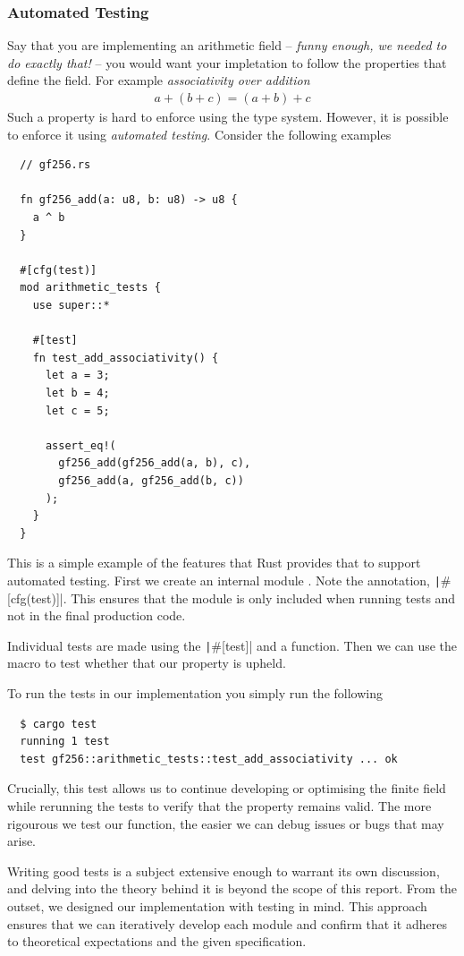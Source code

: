 \documentclass[twoside,11pt]{report}
\theoremstyle{definition}
\theoremstyle{plain}
\begin{document}
\subsubsection{Automated Testing}
Say that you are implementing an arithmetic field -- \textit{funny enough, we needed to do exactly that!} -- you would want your impletation to follow the properties that define the field. For example \textit{associativity over addition}
\begin{align}
  a + (b + c) = (a + b) + c
\end{align}
Such a property is hard to enforce using the type system. However, it is possible to enforce it using \textit{automated testing}. Consider the following examples
\begin{verbatim}
  // gf256.rs

  fn gf256_add(a: u8, b: u8) -> u8 {
    a ^ b
  }

  #[cfg(test)]
  mod arithmetic_tests {
    use super::*
    
    #[test]
    fn test_add_associativity() {
      let a = 3;
      let b = 4;
      let c = 5;

      assert_eq!(
        gf256_add(gf256_add(a, b), c), 
        gf256_add(a, gf256_add(b, c))
      );
    }
  }
\end{verbatim}
This is a simple example of the features that Rust provides that to support automated testing. First we create an internal module . Note the annotation, \texttt|#[cfg(test)]|. This ensures that the module is only included when running tests and not in the final production code.

Individual tests are made using the \texttt|#[test]| and a function. Then we can use the macro  to test whether that our property is upheld.

To run the tests in our implementation you simply run the following
\begin{verbatim}
  $ cargo test
  running 1 test
  test gf256::arithmetic_tests::test_add_associativity ... ok
\end{verbatim}
Crucially, this test allows us to continue developing or optimising the finite field while rerunning the tests to verify that the property remains valid. The more rigourous we test our function, the easier we can debug issues or bugs that may arise.

Writing good tests is a subject extensive enough to warrant its own discussion, and delving into the theory behind it is beyond the scope of this report. From the outset, we designed our implementation with testing in mind. This approach ensures that we can iteratively develop each module and confirm that it adheres to theoretical expectations and the given specification.
\end{document}
